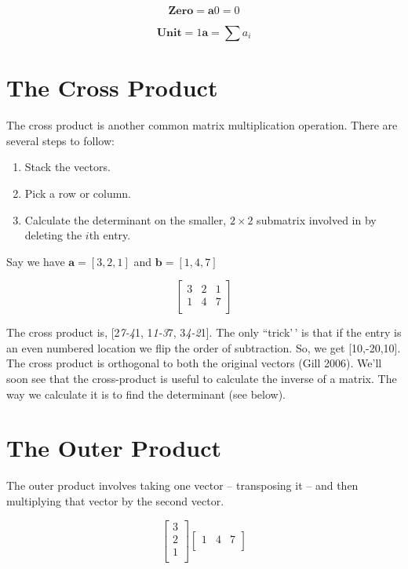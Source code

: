 \documentclass[
]{book}
\begin{document}
\[\textbf{Zero}=\textbf{a}0=0\]

\[\textbf{Unit}=1\textbf{a}=\sum a_i\]

\section{The Cross Product}\label{the-cross-product}

The cross product is another common matrix multiplication operation.
There are several steps to follow:

\begin{enumerate}
\def\labelenumi{(\arabic{enumi})}
\item
  Stack the vectors.
\item
  Pick a row or column.
\item
  Calculate the determinant on the smaller, \(2 \times 2\) submatrix
  involved in by deleting the \(i\)th entry.
\end{enumerate}

Say we have \(\textbf{a}=[3,2,1]\) and \(\textbf{b}=[1,4,7]\)

\[
\begin{bmatrix}
3&2&1\\
1&4&7\\
\end{bmatrix}
\]

The cross product is, {[}2\emph{7-4}1, 1\emph{1-3}7, 3\emph{4-2}1{]}. The only ``trick'\,'
is that if the entry is an even numbered location we flip the order of
subtraction. So, we get {[}10,-20,10{]}. The cross product is orthogonal to
both the original vectors (Gill 2006). We'll soon see that the
cross-product is useful to calculate the inverse of a matrix. The way we
calculate it is to find the determinant (see below).

\section{The Outer Product}\label{the-outer-product}

The outer product involves taking one vector -- transposing it -- and
then multiplying that vector by the second vector.

\[
\begin{bmatrix}
3 \\
2\\
1\\
\end{bmatrix}
\begin{bmatrix}
1&4&7\\
\end{bmatrix}
\]
\end{document}
